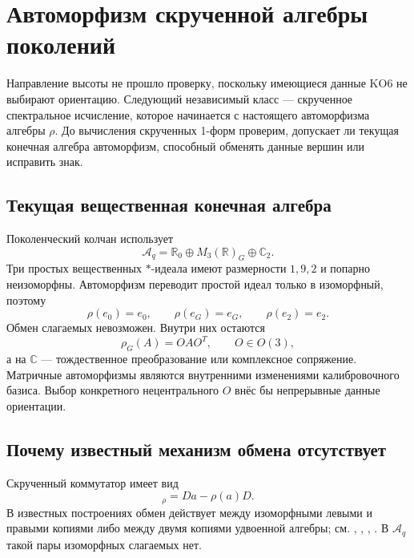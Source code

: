 \chapter{Автоморфизм скрученной алгебры поколений}

Направление высоты не прошло проверку, поскольку имеющиеся данные KO6 не
выбирают ориентацию. Следующий независимый класс --- скрученное спектральное
исчисление, которое начинается с настоящего автоморфизма алгебры \(\rho\).
До вычисления скрученных 1-форм проверим, допускает ли текущая конечная
алгебра автоморфизм, способный обменять данные вершин или исправить знак.

\section{Текущая вещественная конечная алгебра}

Поколенческий колчан использует
\begin{equation}
 \mathcal A_q=\mathbb R_0\oplus M_3(\mathbb R)_G\oplus\mathbb C_2.
 \label{eq:v5-twist-current-algebra}
\end{equation}
Три простых вещественных \(*\)-идеала имеют размерности \(1,9,2\) и попарно
неизоморфны. Автоморфизм переводит простой идеал только в изоморфный, поэтому
\begin{equation}
 \rho(e_0)=e_0,\qquad\rho(e_G)=e_G,\qquad\rho(e_2)=e_2.
 \label{eq:v5-twist-fixed-idempotents}
\end{equation}
Обмен слагаемых невозможен. Внутри них остаются
\begin{equation}\rho_G(A)=OAO^T,\qquad O\in O(3),\end{equation}
а на \(\mathbb C\) --- тождественное преобразование или комплексное
сопряжение. Матричные автоморфизмы являются внутренними изменениями
калибровочного базиса. Выбор конкретного нецентрального \(O\) внёс бы
непрерывные данные ориентации.

\section{Почему известный механизм обмена отсутствует}

Скрученный коммутатор имеет вид
\begin{equation}[D,a]_\rho=Da-\rho(a)D.\end{equation}
В известных построениях обмен действует между изоморфными левыми и правыми
копиями либо между двумя копиями удвоенной алгебры; см.
, ,
, . В \(\mathcal A_q\) такой
пары изоморфных слагаемых нет.

